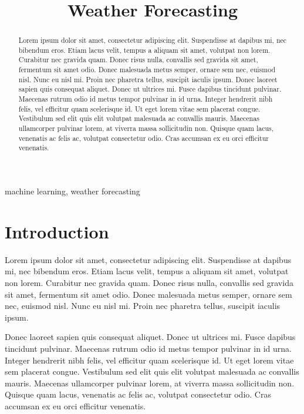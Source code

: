 



\title{Weather Forecasting}
\author{
    \and
    \and
    \and
}

\maketitle

\begin{abstract}
    Lorem ipsum dolor sit amet, consectetur adipiscing elit. Suspendisse at dapibus mi, nec bibendum eros. Etiam lacus velit, tempus a aliquam sit amet, volutpat non lorem. Curabitur nec gravida quam. Donec risus nulla, convallis sed gravida sit amet, fermentum sit amet odio. Donec malesuada metus semper, ornare sem nec, euismod nisl. Nunc eu nisl mi. Proin nec pharetra tellus, suscipit iaculis ipsum.
    Donec laoreet sapien quis consequat aliquet. Donec ut ultrices mi. Fusce dapibus tincidunt pulvinar. Maecenas rutrum odio id metus tempor pulvinar in id urna. Integer hendrerit nibh felis, vel efficitur quam scelerisque id. Ut eget lorem vitae sem placerat congue. Vestibulum sed elit quis elit volutpat malesuada ac convallis mauris. Maecenas ullamcorper pulvinar lorem, at viverra massa sollicitudin non. Quisque quam lacus, venenatis ac felis ac, volutpat consectetur odio. Cras accumsan ex eu orci efficitur venenatis.
\end{abstract}

\begin{IEEEkeywords}
machine learning, weather forecasting
\end{IEEEkeywords}

\section{Introduction}
\label{sec:intro}
Lorem ipsum dolor sit amet, consectetur adipiscing elit.\cite{silverMasteringChessShogi2017}
Suspendisse at dapibus mi, nec bibendum eros. Etiam lacus velit, tempus a aliquam sit amet, volutpat non lorem. Curabitur nec gravida quam. Donec risus nulla, convallis sed gravida sit amet, fermentum sit amet odio. Donec malesuada metus semper, ornare sem nec, euismod nisl. Nunc eu nisl mi. Proin nec pharetra tellus, suscipit iaculis ipsum.

Donec laoreet sapien quis consequat aliquet. Donec ut ultrices mi. Fusce dapibus tincidunt pulvinar. Maecenas rutrum odio id metus tempor pulvinar in id urna. Integer hendrerit nibh felis, vel efficitur quam scelerisque id. Ut eget lorem vitae sem placerat congue. Vestibulum sed elit quis elit volutpat malesuada ac convallis mauris. Maecenas ullamcorper pulvinar lorem, at viverra massa sollicitudin non. Quisque quam lacus, venenatis ac felis ac, volutpat consectetur odio. Cras accumsan ex eu orci efficitur venenatis.

